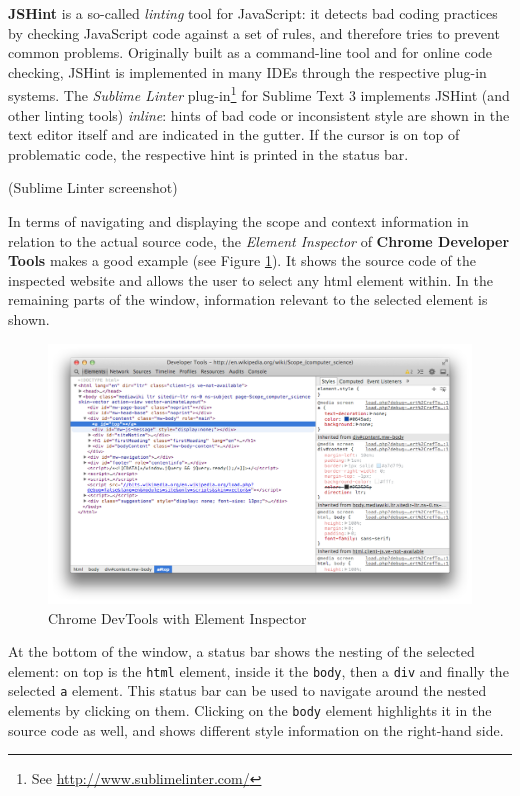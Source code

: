 \textbf{JSHint} is a so-called \emph{linting} tool for JavaScript: it
detects bad coding practices by checking JavaScript code against a set
of rules, and therefore tries to prevent common problems. Originally
built as a command-line tool and for online code checking, JSHint is
implemented in many IDEs through the respective plug-in systems. The
\emph{Sublime Linter} plug-in\footnote{See
  \url{http://www.sublimelinter.com/}} for Sublime Text 3 implements
JSHint (and other linting tools) \emph{inline}: hints of bad code or
inconsistent style are shown in the text editor itself and are indicated
in the gutter. If the cursor is on top of problematic code, the
respective hint is printed in the status bar.

(Sublime Linter screenshot)

In terms of navigating and displaying the scope and context information
in relation to the actual source code, the \emph{Element Inspector} of
\textbf{Chrome Developer Tools} makes a good example (see Figure
\ref{fig:devtools}). It shows the source code of the inspected website
and allows the user to select any \ac{html} element within. In the
remaining parts of the window, information relevant to the selected
element is shown.

\begin{figure}[htbp]
\centering
\includegraphics[keepaspectratio,width=\textwidth,height=0.75\textheight]{img/devtools.png}
\caption{Chrome DevTools with Element Inspector}
\label{fig:devtools}
\end{figure}

At the bottom of the window, a status bar shows the nesting of the
selected element: on top is the \texttt{html} element, inside it the
\texttt{body}, then a \texttt{div} and finally the selected \texttt{a}
element. This status bar can be used to navigate around the nested
elements by clicking on them. Clicking on the \texttt{body} element
highlights it in the source code as well, and shows different style
information on the right-hand side.

